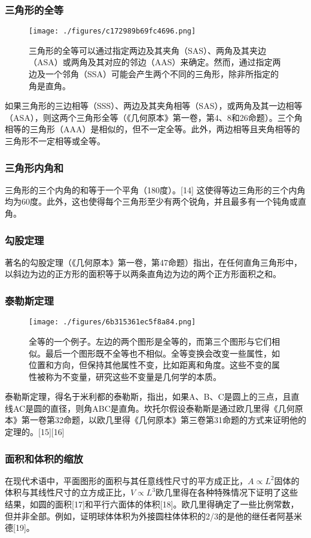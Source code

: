 \subsubsection{三角形的全等}
\begin{figure}[ht]
\centering
\texttt{[image: ./figures/c172989b69fc4696.png]}
\caption{三角形的全等可以通过指定两边及其夹角（SAS）、两角及其夹边（ASA）或两角及其对应的邻边（AAS）来确定。然而，通过指定两边及一个邻角（SSA）可能会产生两个不同的三角形，除非所指定的角是直角。} \label{fig_OJLJH_8}
\end{figure}
如果三角形的三边相等（SSS）、两边及其夹角相等（SAS），或两角及其一边相等（ASA），则这两个三角形全等（《几何原本》第一卷，第4、8和26命题）。三个角相等的三角形（AAA）是相似的，但不一定全等。此外，两边相等且夹角相等的三角形不一定相等或全等。
\subsubsection{三角形内角和}  
三角形的三个内角的和等于一个平角（180度）。[14] 这使得等边三角形的三个内角均为60度。此外，这也使得每个三角形至少有两个锐角，并且最多有一个钝角或直角。
\subsubsection{勾股定理}  
著名的勾股定理（《几何原本》第一卷，第47命题）指出，在任何直角三角形中，以斜边为边的正方形的面积等于以两条直角边为边的两个正方形面积之和。
\subsubsection{泰勒斯定理}
\begin{figure}[ht]
\centering
\texttt{[image: ./figures/6b315361ec5f8a84.png]}
\caption{全等的一个例子。左边的两个图形是全等的，而第三个图形与它们相似。最后一个图形既不全等也不相似。全等变换会改变一些属性，如位置和方向，但保持其他属性不变，比如距离和角度。这些不变的属性被称为不变量，研究这些不变量是几何学的本质。} \label{fig_OJLJH_9}
\end{figure}
泰勒斯定理，得名于米利都的泰勒斯，指出，如果A、B、C是圆上的三点，且直线AC是圆的直径，则角ABC是直角。坎托尔假设泰勒斯是通过欧几里得《几何原本》第一卷第32命题，以欧几里得《几何原本》第三卷第31命题的方式来证明他的定理的。[15][16]
\subsubsection{面积和体积的缩放 } 
在现代术语中，平面图形的面积与其任意线性尺寸的平方成正比，\(A \propto L^2\)固体的体积与其线性尺寸的立方成正比，\(V \propto L^3\)欧几里得在各种特殊情况下证明了这些结果，如圆的面积[17]和平行六面体的体积[18]。欧几里得确定了一些比例常数，但并非全部。例如，证明球体体积为外接圆柱体体积的2/3的是他的继任者阿基米德[19]。
